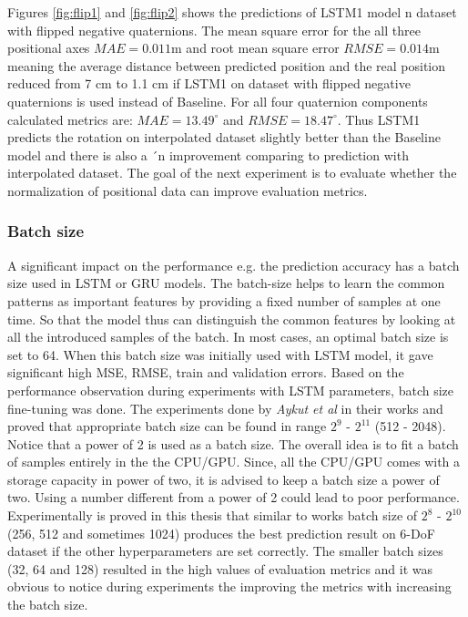 Figures \ref{fig:flip1} and \ref{fig:flip2} shows the predictions of LSTM1 model n dataset with flipped negative quaternions. The mean square error for the all three positional axes $MAE = 0.011$m and root mean square error  $RMSE = 0.014$m meaning the average distance between predicted position and the real position reduced from 7 cm to 1.1 cm if LSTM1 on dataset with flipped negative quaternions is used instead of Baseline. For all four quaternion components calculated metrics  are: $MAE = 13.49^{\circ}$ and $RMSE =18.47^{\circ}$. Thus LSTM1 predicts the rotation on interpolated dataset slightly better than the Baseline model and there is also a ´n improvement comparing to prediction with interpolated dataset. The goal of the next experiment is to evaluate whether the normalization of positional data can improve evaluation metrics. 

\subsubsection{Batch size}
\label{sec:eval:experiments:early:batch}
A significant impact on the performance e.g. the prediction accuracy has a batch size used in LSTM or GRU models. The batch-size helps to learn the common patterns as important features by providing a fixed number of samples at one time. So that the model thus can distinguish the common features by looking at all the introduced samples of the batch. In most cases, an optimal batch size is set to 64. When this batch size was initially used with LSTM model, it gave significant high MSE, RMSE, train and validation errors. Based on the performance observation during experiments with LSTM parameters, batch size fine-tuning was done. The experiments done by \textit{Aykut et al} in their works \cite{delay_compensation_360} and \cite{telepresence} proved that appropriate batch size can be found in range $2^{9}$ - $2^{11}$ (512 - 2048). Notice that a power of 2 is used as a batch size. The overall idea is to fit a batch of samples entirely in the the CPU/GPU. Since, all the CPU/GPU comes with a storage capacity in power of two, it is advised to keep a batch size a power of two. Using a number different from a power of 2 could lead to poor performance. Experimentally is proved in this thesis that similar to works \cite{delay_compensation_360, telepresence}  batch size of $2^{8}$ - $2^{10}$ (256, 512 and sometimes 1024) produces the best prediction result on 6-DoF dataset if the other hyperparameters are set correctly. The smaller batch sizes (32, 64 and 128) resulted in the high values of evaluation metrics and it was obvious to notice during experiments the improving the metrics with increasing the batch size.

